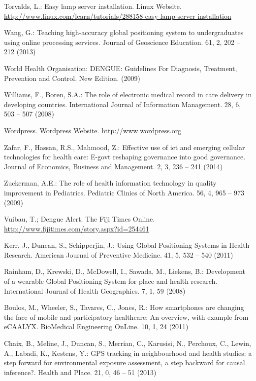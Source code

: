 \documentclass[runningheads,a4paper]{llncs}
\begin{document}
\begin{thebibliography}{4}
 Torvalds, L.:
Easy lamp server installation. Linux Website.
\url{http://www.linux.com/learn/tutorials/288158-easy-lamp-server-installation}

 Wang, G.:
Teaching high-accuracy global positioning system to undergraduates using online processing services.
Journal of Geoscience Education. 61, 2, 202 -- 212 (2013)

 World Health Organisation:
DENGUE: Guidelines For Diagnosis, Treatment, Prevention and Control. New Edition. (2009) 

 Williams, F., Boren, S.A.:
\newblock The role of electronic medical record in care delivery in developing countries.
International Journal of Information Management. 28, 6, 503 -- 507 (2008)

 Wordpress. Wordpress Website. \url{http://www.wordpress.org} 

 Zafar, F., Hassan, R.S., Mahmood, Z.:
Effective use of ict and emerging cellular technologies for health care: E-govt reshaping governance into good governance.
Journal of Economics, Business and Management. 2, 3, 236 -- 241 (2014)

 Zuckerman, A.E.:
The role of health information technology in quality improvement in Pediatrics.
Pediatric Clinics of North America. 56, 4, 965 -- 973 (2009)

 Vuibau, T.; Dengue Alert. The Fiji Times Online. \url{http://www.fijitimes.com/story.aspx?id=254461}

 Kerr, J., Duncan, S., Schipperjin, J.: 
Using Global Positioning Systems in Health Research. 
American Journal of Preventive Medicine. 41, 5, 532 -- 540 (2011)

 Rainham, D., Krewski, D., McDowell, I., Sawada, M., Liekens, B.: 
Development of a wearable Global Positioning System for place and health research. 
International Journal of Health Geographics. 7, 1, 59 (2008)

 Boulos, M., Wheeler, S., Tavares, C., Jones, R.: 
How smartphones are changing the face of mobile and participatory healthcare: An overview, with example from eCAALYX. 
BioMedical Engineering OnLine. 10, 1, 24 (2011)

 Chaix, B., Meline, J., Duncan, S., Merrian, C., Karusisi, N., Perchoux, C., Lewin, A., Labadi, K., Kestens, Y.:
GPS tracking in neighbourhood and health studies: a step forward for environmental exposure assessment, a step backward for causal inference?.
Health and Place. 21, 0, 46 -- 51 (2013)


\end{thebibliography}
\end{document}
